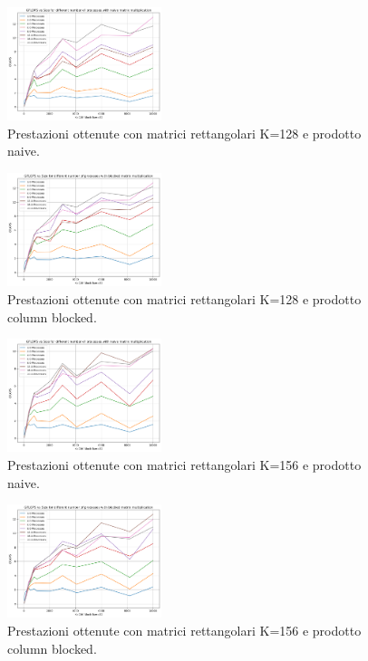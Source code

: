 \documentclass[conference]{IEEEtran}
\begin{document}
\begin{figure}[H]
    \centering
    \includegraphics[width=0.4\textwidth]{resources/rettangolari_k128_naive.png}
    \caption{Prestazioni ottenute con matrici rettangolari K=128 e prodotto naive.}
    \label{fig:rect_k128_matrix_naive}
\end{figure}
\begin{figure}[H]
    \centering
    \includegraphics[width=0.4\textwidth]{resources/rettangolari_k128_blocked.png}
    \caption{Prestazioni ottenute con matrici rettangolari K=128 e prodotto column blocked.}
    \label{fig:rect_k128_matrix_blocked}
\end{figure}
\begin{figure}[H]
    \centering
    \includegraphics[width=0.4\textwidth]{resources/rettangolari_k156_naive.png}
    \caption{Prestazioni ottenute con matrici rettangolari K=156 e prodotto naive.}
    \label{fig:rect_k156_matrix_naive}
\end{figure}
\begin{figure}[H]
    \centering
    \includegraphics[width=0.4\textwidth]{resources/rettangolari_k156_blocked.png}
    \caption{Prestazioni ottenute con matrici rettangolari K=156 e prodotto column blocked.}
    \label{fig:rect_k156_matrix_blocked}
\end{figure}
\end{document}
